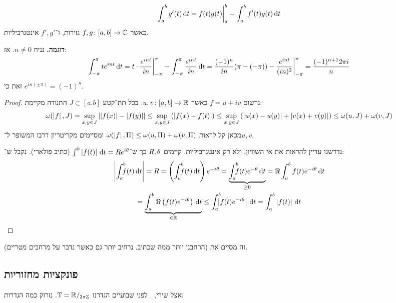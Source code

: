 \documentclass[]{../../../../tex/classes/styledArticle}
\newcommand\tb{\mathbb{T}}
\begin{document}
	
	\begin{Theorem}
		\[ \int^{b}_a g'(t)\,\mathrm{d}t = f(t)g(t)\bigg\vert^{b}_a - \int^{b}_a f'(t)g(t)\,\mathrm{d}t \]
		כאשר $f, g \colon [a, b] \to \mathbb{C}$ גזירות, ו־$f', g'$ אינטגרביליות. 
	\end{Theorem}
	
	\textbf{דוגמה. }נניח $n \neq 0$. אז: 
	\[ \int^{\pi}_{- \pi}te^{i nt}\,\mathrm{d}t = t \cdot \frac{e^{i nt}}{in}\bigg\vert^{\pi}_{- \pi} - \int^{\pi}_{- \pi} \frac{e^{int}}{in}\,\mathrm{d}t = \frac{(-1)^{n}}{in}(\pi - (-\pi)) - \frac{e^{int}}{(in)^{2}}\bigg\vert^{\pi}_{-\pi} = \frac{(-1)^{n + 1}2\pi i}{n}\]
	זאת כי $e^{in(\pm\pi)} = (-1)^{n}$. 
	
	\begin{proof}
		נרשום $f =u + iv$ כאשר $u, v \colon [a, b] \to \mathbb{R}$. בכל תת־קטע $J \subset [a. b]$ התנודה מקיימת: 
		\[ \omega(\left \lvert f \right \rvert, J) = \sup_{x, y \in J}\left \lvert \left \lvert f(x) \right \rvert - \left \lvert f(y) \right \rvert \right \rvert \le \sup_{x, y \in J}\left ( \left \lvert f(x) - f(t) \right \rvert \right ) \le \sup_{x, y \in J}\left ( \left \lvert u(x) - u(y) \right \rvert + \left \lvert v(x) + v(y) \right \rvert \right ) \le \omega(u, J) + \omega(v, J) \]
		מכאן קל לראות $\omega(\left \lvert f \right \rvert, \Pi) \le \omega(u, \Pi) + \omega(v, \Pi)$ ומסיימים מקריטריון דרבו המשופר ל־$u, v$. 
		
		נדרשנו עדיין להראות את אי השוויון, ולא רק אינטגרביליות. קיימים $R, \theta$ כך ש־$\int^{b}\left \lvert f(t) \right \rvert\,\mathrm{d}t = Re^{i\theta}$ (כתיב פולארי). נקבל ש־: 
		\begin{multline*}
			\sof{\int^{b}_a \dequad \ f(t)\dt} = R = \cl{\int^{b}_a\dequad \ f(t)\dt}e^{-i\ta} =\underbrace{\int^{b}_a \dequad \ f(t)e^{-\ta}\dt}_{\ge 0} = \Re\int^{b}_a f(t)e^{-i\ta}\dt \\
			= \underbrace{\int^{b}_a \Re\cl{f(t)e^{-i\ta}}\dt }_{\in \R}\le \int^{b}_a\dequad \  \sof{f(t)e^{-i\ta}}\dt = \int^{b}_a\sof{f(t)}\dt
		\end{multline*}
	\end{proof}
	זה מסיים את  (הרחבנו יותר ממה שכתוב. נרחיב יותר גם כאשר נדבר על מרחבים מטריים). 
	
	\subsection*{פונקציות מחזוריות}
	אצל שירי, . לפני שבועיים הגדרנו $\tb = \R/_{2 \pi \Z}$. נזרוק כמה הגדרות: 
	
\end{document}

